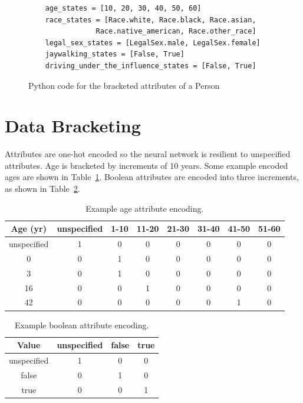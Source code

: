 \documentclass{report}
\begin{document}
\begin{figure}
    \centering
    \begin{verbatim}
    age_states = [10, 20, 30, 40, 50, 60]
    race_states = [Race.white, Race.black, Race.asian,
                Race.native_american, Race.other_race]
    legal_sex_states = [LegalSex.male, LegalSex.female]
    jaywalking_states = [False, True]
    driving_under_the_influence_states = [False, True]
    \end{verbatim}
    \caption{Python code for the bracketed attributes of a Person}
    \label{fig:code_for_person_attribute_domains}
\end{figure}

\section{Data Bracketing}

Attributes are one-hot encoded so the neural network is resilient to unspecified attributes. Age is
bracketed by increments of 10 years. Some example encoded ages are shown in
Table~\ref{tab:example_age_attribute_encoding}. Boolean attributes are encoded into three
increments, as shown in Table~\ref{tab:example_boolean_attribute_encoding}.
    
\begin{table}
    \centering
    \begin{tabular}{c|c|c|c|c|c|c|c}
        Age (yr) & unspecified & 1-10 & 11-20 & 21-30 & 31-40 & 41-50 & 51-60 \\\hline
        unspecified & 1 & 0 & 0 & 0 & 0 & 0 & 0 \\
        0 & 0 & 1 & 0 & 0 & 0 & 0 & 0 \\
        3 & 0 & 1 & 0 & 0 & 0 & 0 & 0 \\
        16 & 0 & 0 & 1 & 0 & 0 & 0 & 0 \\
        42 & 0 & 0 & 0 & 0 & 0 & 1 & 0
    \end{tabular}
    \caption{Example age attribute encoding.}
    \label{tab:example_age_attribute_encoding}
\end{table}

\begin{table}
    \centering
    \begin{tabular}{c|c|c|c}
        Value & unspecified & false & true \\\hline
        unspecified & 1 & 0 & 0 \\
        false & 0 & 1 & 0 \\
        true & 0 & 0 & 1
    \end{tabular}
    \caption{Example boolean attribute encoding.}
    \label{tab:example_boolean_attribute_encoding}
\end{table}
\end{document}
